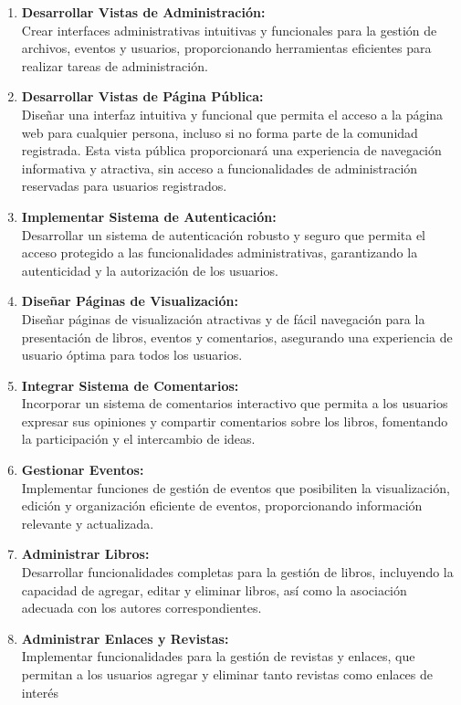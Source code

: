 \documentclass[a4paper, 12pt]{book}
\begin{document}
\begin{enumerate}
  \item \textbf{Desarrollar Vistas de Administración:} \\Crear interfaces administrativas intuitivas y funcionales para la gestión de archivos, eventos y usuarios, proporcionando herramientas eficientes para realizar tareas de administración.
  \item \textbf{Desarrollar Vistas de Página Pública:} \\Diseñar una interfaz intuitiva y funcional que permita el acceso a la página web para cualquier persona, incluso si no forma parte de la comunidad registrada. Esta vista pública proporcionará una experiencia de navegación informativa y atractiva, sin acceso a funcionalidades de administración reservadas para usuarios registrados.
  \item \textbf{Implementar Sistema de Autenticación:} \\Desarrollar un sistema de autenticación robusto y seguro que permita el acceso protegido a las funcionalidades administrativas, garantizando la autenticidad y la autorización de los usuarios.
  \item \textbf{Diseñar Páginas de Visualización:} \\Diseñar páginas de visualización atractivas y de fácil navegación para la presentación de libros, eventos y comentarios, asegurando una experiencia de usuario óptima para todos los usuarios.
  \item \textbf{Integrar Sistema de Comentarios:} \\Incorporar un sistema de comentarios interactivo que permita a los usuarios expresar sus opiniones y compartir comentarios sobre los libros, fomentando la participación y el intercambio de ideas.
  \item \textbf{Gestionar Eventos:} \\Implementar funciones de gestión de eventos que posibiliten la visualización, edición y organización eficiente de eventos, proporcionando información relevante y actualizada.
  \item \textbf{Administrar Libros:} \\Desarrollar funcionalidades completas para la gestión de libros, incluyendo la capacidad de agregar, editar y eliminar libros, así como la asociación adecuada con los autores correspondientes.
  \item \textbf{Administrar Enlaces y Revistas:} \\Implementar funcionalidades para la gestión de revistas y enlaces, que permitan a los usuarios agregar y eliminar tanto revistas como enlaces de interés

\end{enumerate}
\end{document}

